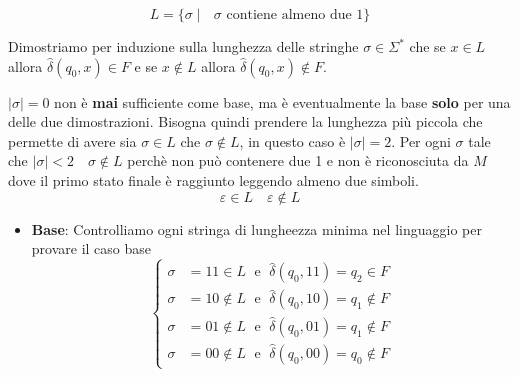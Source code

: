 \documentclass[a4paper]{article}
\begin{document}
\ex{}
{
    \[L = \{\sigma \; | \; \text{ $\sigma$ contiene almeno due 1}\}\]
    \begin{figure}[H]
        \centering
      \end{figure}
    \noindent
    Dimostriamo per induzione sulla lunghezza delle stringhe \( \sigma \in \Sigma^* \) 
  che se \( x \in L \) allora \( \hat{\delta}(q_0, x) \in F \) e se \( x \notin L \) allora
  \( \hat{\delta}(q_0, x) \notin F \).

  \vspace{1em}
  \noindent
  \( \left| \sigma  \right| = 0 \) non è \textbf{mai} sufficiente come base, ma
  è eventualmente la base \textbf{solo} per una delle due dimostrazioni. Bisogna
  quindi prendere la lunghezza più piccola che permette di avere sia \( \sigma \in L \) 
  che  \( \sigma \notin L \), in questo caso è \( \left| \sigma  \right| = 2 \).
  Per ogni \( \sigma  \) tale che \( \left| \sigma  \right| < 2 \quad \sigma \notin L \)
  perchè non può contenere due 1 e non è riconosciuta da \( M \) dove il primo stato finale
  è raggiunto leggendo almeno due simboli.
  \[
    \varepsilon \in L \quad \varepsilon \notin L
  \] 
  \begin{itemize}
    \item \textbf{Base}: Controlliamo ogni stringa di lungheezza minima nel linguaggio per
      provare il caso base
      \[
        \begin{cases}
          \sigma &= 11 \in L \; \text{ e } \; \hat{\delta}(q_0, 11) = q_2 \in F \\
          \sigma &= 10 \notin L \; \text{ e } \; \hat{\delta}(q_0, 10) = q_1 \notin F \\
          \sigma &= 01 \notin L \; \text{ e } \; \hat{\delta}(q_0, 01) = q_1 \notin F \\
          \sigma &= 00 \notin L \; \text{ e } \; \hat{\delta}(q_0, 00) = q_0 \notin F
        \end{cases}
      \] 


\end{itemize}}
\end{document}
